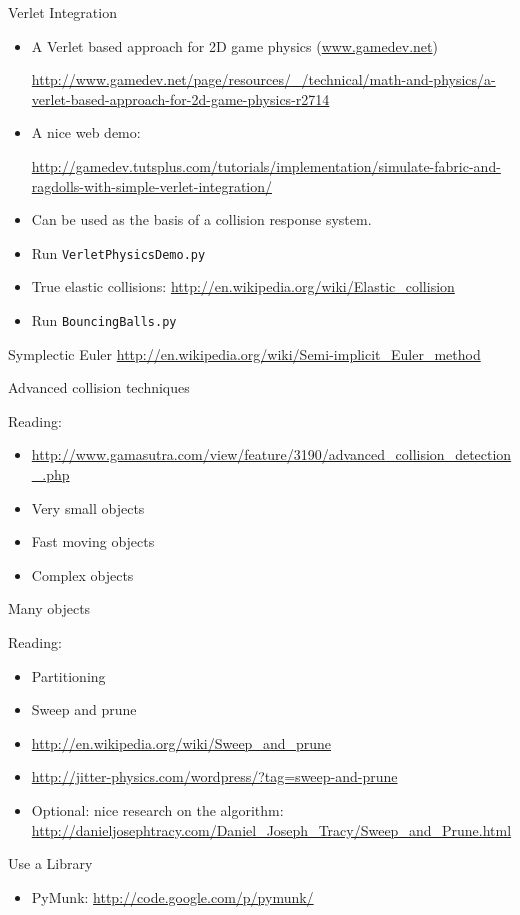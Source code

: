 \documentclass[handout,t,compress]{beamer}
\newcommand{\bframe}[1]{\begin{frame}[fragile]{#1}}
\begin{document}
\bframe{Verlet Integration}

\begin{itemize}
\item A Verlet based approach for 2D game physics (\url{www.gamedev.net})

{\tiny\url{http://www.gamedev.net/page/resources/_/technical/math-and-physics/a-verlet-based-approach-for-2d-game-physics-r2714}}
\item A nice web demo:

{\tiny\url{http://gamedev.tutsplus.com/tutorials/implementation/simulate-fabric-and-ragdolls-with-simple-verlet-integration/}}
\item Can be used as the basis of a collision response system.
\item Run {\tt VerletPhysicsDemo.py}
\item True elastic collisions:
\url{http://en.wikipedia.org/wiki/Elastic_collision}
\item Run {\tt BouncingBalls.py}
\end{itemize}

\end{frame}


\bframe{Symplectic Euler}
\url{http://en.wikipedia.org/wiki/Semi-implicit_Euler_method}
\end{frame}


\bframe{Advanced collision techniques}

Reading:
\begin{itemize}
\item {\tiny
\url{http://www.gamasutra.com/view/feature/3190/advanced_collision_detection_.php}
}
\item Very small objects
\item Fast moving objects
\item Complex objects
\end{itemize}

\end{frame}

\bframe{Many objects}

Reading:
\begin{itemize}
\item Partitioning
\item Sweep and prune
\item \url{http://en.wikipedia.org/wiki/Sweep_and_prune}
\item \url{http://jitter-physics.com/wordpress/?tag=sweep-and-prune}
\item Optional:  nice research on the algorithm:
\url {http://danieljosephtracy.com/Daniel_Joseph_Tracy/Sweep_and_Prune.html}
\end{itemize}

\end{frame}

\bframe{Use a Library}
\begin{itemize}
\item PyMunk: \url{http://code.google.com/p/pymunk/}
\end{itemize}
\end{frame}
\end{document}
